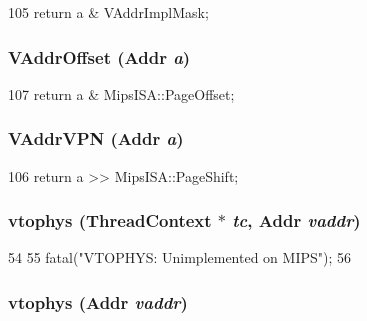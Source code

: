 \begin{DoxyCode}
105 { return a & VAddrImplMask; }
\end{DoxyCode}
\hypertarget{namespaceMipsISA_a2644e6b57b6479a8274c7c0c5b8bb8c3}{
\subsubsection[{VAddrOffset}]{ VAddrOffset ({\bf Addr} {\em a})}}
\label{namespaceMipsISA_a2644e6b57b6479a8274c7c0c5b8bb8c3}



\begin{DoxyCode}
107 { return a & MipsISA::PageOffset; }
\end{DoxyCode}
\hypertarget{namespaceMipsISA_a6a3762cb0de8ab43a6041339c5b38ba0}{
\subsubsection[{VAddrVPN}]{ VAddrVPN ({\bf Addr} {\em a})}}
\label{namespaceMipsISA_a6a3762cb0de8ab43a6041339c5b38ba0}



\begin{DoxyCode}
106 { return a >> MipsISA::PageShift; }
\end{DoxyCode}
\hypertarget{namespaceMipsISA_ad4bbbca3210dee66152520984c3aac6a}{
\subsubsection[{vtophys}]{ vtophys ({\bf ThreadContext} $\ast$ {\em tc}, \/  {\bf Addr} {\em vaddr})}}
\label{namespaceMipsISA_ad4bbbca3210dee66152520984c3aac6a}



\begin{DoxyCode}
54 {
55     fatal("VTOPHYS: Unimplemented on MIPS\n");
56 }
\end{DoxyCode}
\hypertarget{namespaceMipsISA_a3828815371ad2b0a1be60abdcb405cf9}{
\subsubsection[{vtophys}]{ vtophys ({\bf Addr} {\em vaddr})}}
\label{namespaceMipsISA_a3828815371ad2b0a1be60abdcb405cf9}



